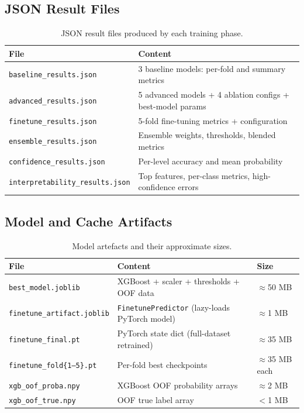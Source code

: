\documentclass[11pt,a4paper]{article}
\begin{document}
\subsection{JSON Result Files}
\begin{table}[H]
\centering
\caption{JSON result files produced by each training phase.}
\begin{tabular}{ll}
\toprule
File & Content \\
\midrule
\texttt{baseline\_results.json} & 3 baseline models: per-fold and summary metrics \\
\texttt{advanced\_results.json} & 5 advanced models + 4 ablation configs + best-model params \\
\texttt{finetune\_results.json} & 5-fold fine-tuning metrics + configuration \\
\texttt{ensemble\_results.json} & Ensemble weights, thresholds, blended metrics \\
\texttt{confidence\_results.json} & Per-level accuracy and mean probability \\
\texttt{interpretability\_results.json} & Top features, per-class metrics, high-confidence errors \\
\bottomrule
\end{tabular}
\end{table}

\subsection{Model and Cache Artifacts}
\begin{table}[H]
\centering
\caption{Model artefacts and their approximate sizes.}
\begin{tabular}{lll}
\toprule
File & Content & Size \\
\midrule
\texttt{best\_model.joblib} & XGBoost + scaler + thresholds + OOF data & $\approx$50 MB \\
\texttt{finetune\_artifact.joblib} & \texttt{FinetunePredictor} (lazy-loads PyTorch model) & $\approx$1 MB \\
\texttt{finetune\_final.pt} & PyTorch state dict (full-dataset retrained) & $\approx$35 MB \\
\texttt{finetune\_fold\{1--5\}.pt} & Per-fold best checkpoints & $\approx$35 MB each \\
\texttt{xgb\_oof\_proba.npy} & XGBoost OOF probability arrays & $\approx$2 MB \\
\texttt{xgb\_oof\_true.npy} & OOF true label array & $<$1 MB \\
\bottomrule
\end{tabular}
\end{table}
\end{document}
